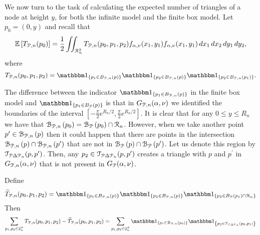 We now turn to the task of calculating the expected number of triangles of a node at height $y$, for both the infinite model and the finite box model. Let $p_0 = (0,y)$ and recall that 
\[
	\mathbb{E}\left[T_{{\mathcal P},n}(p_0)\right] = \frac{1}{2}\iint_{{\mathcal R}_n^2} T_{{\mathcal P},n}(p_0,p_1,p_2)
	f_{\alpha,\nu}(x_1,y_1) f_{\alpha,\nu}(x_1,y_1) \, dx_1 \, dx_2 \, dy_1 \, dy_2,
\]
where
\[
	T_{\Pcal,n}(p_0,p_1,p_2) = \ind{p_1 \in B_{\Pcal,n}(p)}\ind{p_2 \in B_{\Pcal,n}(p)}\ind{p_2 \in B_{\Pcal,n}(p_1)}.
\]

The difference between the indicator $\ind{p_1 \in B_{\Pcal,n}(p)}$ in the finite box model and $\ind{p_1 \in B_{\Pcal}(p)}$ is that in $G_{{\mathcal P},n}(\alpha,\nu)$ we identified the boundaries of the interval $[-\frac{\pi}{2}e^{R_n/2}, \frac{\pi}{2} e^{R_n/2}]$. It is clear that for any $0 \le y \le R_n$ we have that ${\mathcal B}_{{\mathcal P},n}\left(p_0\right) = {\mathcal B}_{{\mathcal P}}\left(p_0\right) \cap {\mathcal R}_n$. However, when we take another point $p^\prime \in {\mathcal B}_{{\mathcal P},n}\left(p\right)$ then it could happen that there are points in the intersection ${\mathcal B}_{{\mathcal P},n}\left(p\right) \cap {\mathcal B}_{{\mathcal P},n}\left(p^\prime\right)$ that are not in ${\mathcal B}_{{\mathcal P}}\left(p\right) \cap {\mathcal B}_{{\mathcal P}}\left(p^\prime\right)$. Let us denote this region by $\mathcal{T}_{{\mathcal P} \Delta {\mathcal P}_n}(p,p^\prime)$. Then, any $p_2 \in \mathcal{T}_{{\mathcal P} \Delta {\mathcal P}_n}(p,p^\prime)$ creates a triangle with $p$ and $p^\prime$ in $G_{{\mathcal P},n}(\alpha,\nu)$ that is not present in $G_{{\mathcal P}}(\alpha, \nu)$.  

Define
\begin{equation}\label{eq:def_tilde_triangle_indicator}
	\widetilde{T}_{\Pcal,n}(p_0,p_1,p_2) = \ind{p_1 \in B_{\Pcal,n}(p)}\ind{p_2 \in B_{\Pcal,n}(p)}\ind{p_2 \in B_{\Pcal}(p_1) \cap \Rcal_n}
\end{equation}
Then
\[
	\sum_{p_1,p_2 \in 2^\Pcal_n} T_{\Pcal,n}(p_0,p_1,p_2) - \widetilde{T}_{\Pcal,n}(p_0,p_1,p_2)
	= \sum_{p_1,p_2 \in 2^\Pcal_n} \ind{p_1 \in \BallPon{p_0}} \ind{p_2 \in \mathcal{T}_{\Pcal \Delta \Pcal_n}(p_0,p_1)}
\]

